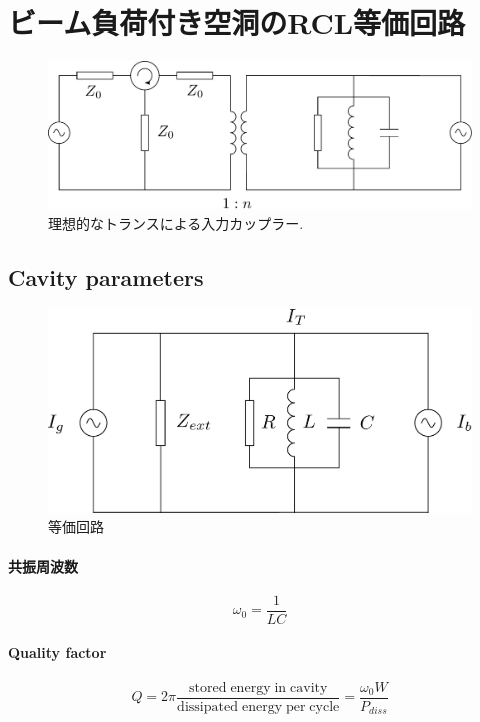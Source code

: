 \documentclass[book]{jlreq}
\begin{document}
\section{ビーム負荷付き空洞のRCL等価回路}

\begin{figure}[hbt]
    \begin{center}
      \includegraphics[width=12cm,clip]{figs/Cavity_Model.pdf}
      \caption{理想的なトランスによる入力カップラー.}
     \label{Cavity_Model}
    \end{center}
\end{figure}

\subsection{Cavity parameters}

\begin{figure}[hbt]
    \begin{center}
      \includegraphics[width=12cm,clip]{figs/Equivalent_Circuit}
      \caption{等価回路}
     \label{Equivalent_Circuit}
    \end{center}
\end{figure}
%
\paragraph{共振周波数}
%
\begin{equation}
    \omega_0 = \frac{1}{L C}
\end{equation}
%
\paragraph{Quality factor}
%
\begin{equation}
    Q = 2\pi \frac{\mathrm{stored\;energy\;in\;cavity}}{\mathrm{dissipated \; energy\;per\;cycle}} = \frac{\omega_0 W}{P_{diss}}
\end{equation}
%
\end{document}
